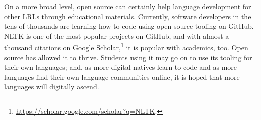 On a more broad level, open source can certainly help language development for other LRLs through educational materials. Currently, software developers in the tens of thousands are learning how to code using open source tooling on GitHub. NLTK is one of the most popular projects on GitHub, and with almost a thousand citations on Google Scholar,\footnote{\href{https://scholar.google.com/scholar?q=NLTK}{https://scholar.google.com/scholar?q=NLTK}. } it is popular with academics, too. Open source has allowed it to thrive. Students using it may go on to use its tooling for their own languages; and, as more digital natives learn to code and as more languages find their own language communities online, it is hoped that more languages will digitally ascend.


